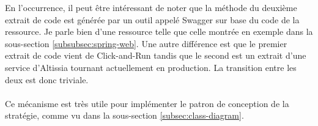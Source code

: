 En l'occurrence, il peut être intéressant de noter que la méthode du deuxième extrait de code est générée par un outil appelé Swagger sur base du code de la ressource.
Je parle bien d'une ressource telle que celle montrée en exemple dans la sous-section \ref{subsubsec:spring-web}.
Une autre différence est que le premier extrait de code vient de Click-and-Run tandis que le second est un extrait d'une service d'Altissia tournant actuellement en production.
La transition entre les deux est donc triviale.

\paragraph{}
Ce mécanisme est très utile pour implémenter le patron de conception de la stratégie, comme vu dans la sous-section \ref{subsec:class-diagram}.
